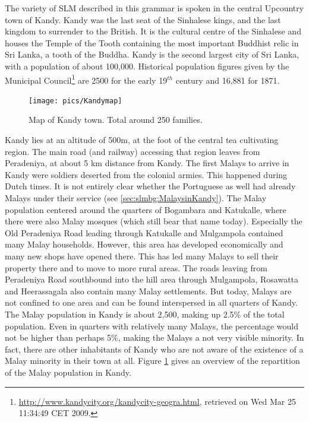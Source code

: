The variety of SLM described in this grammar is spoken in the central Upcountry town of Kandy. Kandy was the last seat of the Sinhalese kings, and the last kingdom to surrender to the British. It is the cultural centre of the Sinhalese and houses the Temple of the Tooth containing the most important Buddhist relic in Sri Lanka, a tooth of the Buddha. Kandy is the second largest city of Sri Lanka, with a population of about 100,000. Historical population figures given by the Municipal Council\footnote{\url{http://www.kandycity.org/kandycity-geogra.html}, retrieved on Wed Mar 25 11:34:49 CET 2009.} are 2500 for the early 19$^{th}$ century and 16,881 for 1871.

\begin{figure}
	\centering
		\texttt{[image: pics/Kandymap]}
	\caption[Map of Kandy town]{Map of Kandy town. Total around 250 families.}
	\label{fig:Kandymap}
\end{figure}

Kandy lies at an altitude of 500m, at the foot of the central tea cultivating region. The main road (and railway) accessing that region leaves from Peradeniya, at about 5 km distance from Kandy. The first Malays to arrive in Kandy were soldiers deserted from the colonial armies. This happened during Dutch times. It is not entirely clear whether the Portuguese as well had  already Malays under their service (see \ref{sec:slmbg:MalaysinKandy}). The Malay population centered around the quarters of Bogambara and Katukalle, where there were also Malay mosques (which still bear that name today). Especially the Old Peradeniya Road leading through Katukalle and Mulgampola contained many Malay households. However, this area has developed economically and many new shops have opened there. This has led many Malays to sell their property there and to move to more rural areas. The roads leaving from Peradeniya Road southbound into the hill area through Mulgampola, Rosawatta and Heerassagala also contain many Malay settlements. But today, Malays are not confined to one area and can be found interspersed in all quarters of Kandy. The Malay population in Kandy is about 2,500, making up  2.5\% of the total population. Even in quarters with relatively many Malays, the percentage would not be higher than perhaps 5\%, making the Malays a not  very visible minority. In fact, there are other inhabitants of Kandy who are not aware of the existence of a Malay minority in their town at all. Figure \ref{fig:Kandymap} gives an overview of the repartition of the Malay population in Kandy.


